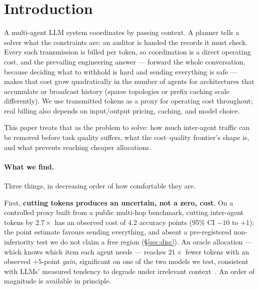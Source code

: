 \documentclass[sigconf,anonymous]{aamas}
\theoremstyle{remark}
\begin{document}

\maketitle

\section{Introduction}

A multi-agent LLM system coordinates by passing context. A planner
tells a solver what the constraints are; an auditor is handed the
records it must check. Every such transmission is billed per token, so
coordination is a direct operating cost, and the prevailing
engineering answer --- forward the whole conversation, because
deciding what to withhold is hard and sending everything is safe ---
makes that cost grow quadratically in the number of agents for
architectures that accumulate or broadcast history (sparse topologies
or prefix caching scale differently). We use transmitted tokens as a
proxy for operating cost throughout; real billing also depends on
input/output pricing, caching, and model choice.

This paper treats that as the problem to solve: how much inter-agent
traffic can be removed before task quality suffers, what the
cost--quality frontier's shape is, and what prevents reaching cheaper
allocations.

\paragraph{What we find.} Three things, in decreasing order of how
comfortable they are.

First, \textbf{cutting tokens produces an uncertain, not a zero,
cost}. On a controlled proxy built from a public multi-hop benchmark,
cutting inter-agent tokens by $2.7\times$ has an observed cost of $4.2$
accuracy points (95\% CI $-10$ to $+1$): the point estimate favours
sending everything, and absent a pre-registered non-inferiority test we
do not claim a free region (\S\ref{sec:disc}). An oracle allocation ---
which knows which item each agent needs --- reaches $21\times$ fewer
tokens with an observed $+5$-point \emph{gain}, significant on one of
the two models we test, consistent with LLMs' measured tendency to
degrade under irrelevant
context~\cite{distracted2025,nolima2025,liu2024}. An order of magnitude
is available in principle.
\end{document}
